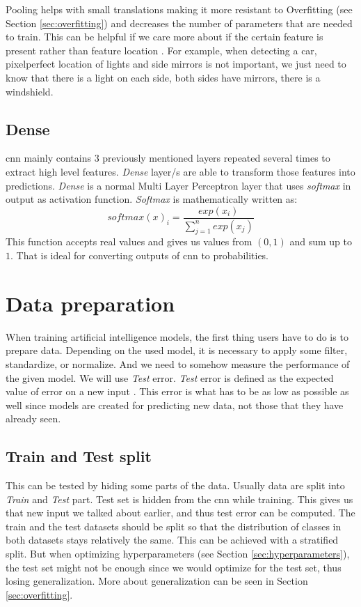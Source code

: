 \documentclass[thesis=B,english]{FITthesis}[2019/12/23]
\begin{document}
    Pooling helps with small translations making it more resistant to Overfitting (see Section \ref{sec:overfitting}) and decreases the number of parameters that are needed to train. This can be helpful if we care more about if the certain feature is present rather than feature location \cite{bengio2017deep}. For example, when detecting a car, pixelperfect location of lights and side mirrors is not important, we just need to know that there is a light on each side, both sides have mirrors, there is a windshield.
    
\subsection{Dense}
    \gls{cnn} mainly contains 3 previously mentioned layers repeated several times to extract high level features. \emph{Dense} layer/s are able to transform those features into predictions. \emph{Dense} is a normal Multi Layer Perceptron layer that uses \emph{softmax} in output as activation function. \emph{Softmax} is mathematically written as:
    $$softmax(x)_{i}=\frac{exp(x_{i})}{\sum_{j=1}^{n}exp(x_{j})}$$  
    This function accepts real values and gives us values from $(0,1)$ and sum up to $1$. That is ideal for converting outputs of \gls{cnn} to probabilities.  

\section{Data preparation}
    When training artificial intelligence models, the first thing users have to do is to prepare data. Depending on the used model, it is necessary to apply some filter, standardize, or normalize. And we need to somehow measure the performance of the given model. We will use \emph{Test} error. \emph{Test} error is defined as the expected value of error on a new input \cite{bengio2017deep}. This error is what has to be as low as possible as well since models are created for predicting new data, not those that they have already seen. 

\subsection{Train and Test split}
    This can be tested by hiding some parts of the data. Usually data are split into \emph{Train} and \emph{Test} part. Test set is hidden from the \gls{cnn} while training. This gives us that new input we talked about earlier, and thus test error can be computed. The train and the test datasets should be split so that the distribution of classes in both datasets stays relatively the same. This can be achieved with a stratified split. But when optimizing hyperparameters (see Section \ref{sec:hyperparameters}), the test set might not be enough since we would optimize for the test set, thus losing generalization. More about generalization can be seen in Section \ref{sec:overfitting}. 
\end{document}
